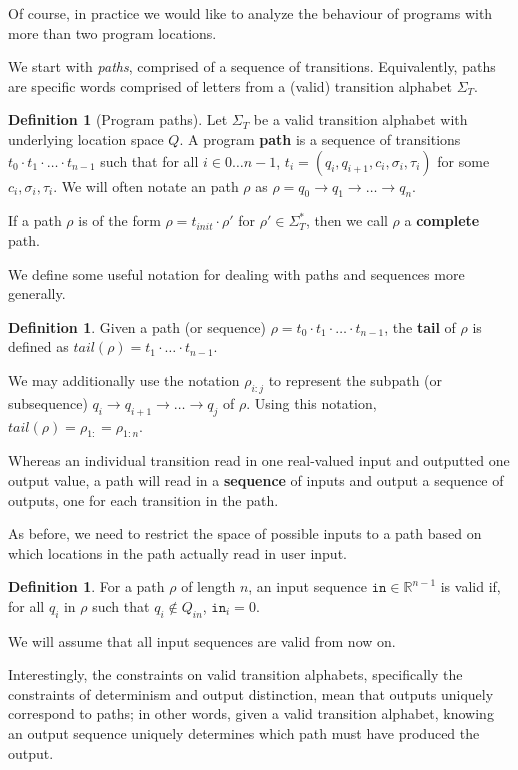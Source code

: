 \documentclass[12pt]{article}
\newcommand{\RR}{\mathbb{R}}
\theoremstyle{definition}
\newtheorem{defn}[thm]{Definition}
\begin{document}
Of course, in practice we would like to analyze the behaviour of programs with more than two program locations.

We start with \textit{paths}, comprised of a sequence of transitions. Equivalently, paths are specific words comprised of letters from a (valid) transition alphabet $\Sigma_T$. 

\begin{defn}[Program paths]
    Let $\Sigma_T$ be a valid transition alphabet with underlying location space $Q$. A program \textbf{path} is a sequence of transitions $t_0\cdot t_1\cdot \ldots\cdot t_{n-1}$ such that for all $i\in 0\ldots n-1$, $t_i = (q_i, q_{i+1}, c_i, \sigma_i, \tau_i)$ for some $c_i, \sigma_i, \tau_i$. We will often notate an path $\rho$ as $\rho = q_0\to q_1\to \ldots \to q_n$. 

    If a path $\rho$ is of the form $\rho = t_{init}\cdot \rho'$ for $\rho'\in \Sigma_T^*$, then we call $\rho$ a \textbf{complete} path. 
\end{defn}

We define some useful notation for dealing with paths and sequences more generally. 

\begin{defn}
    Given a path (or sequence) $\rho = t_0\cdot t_1\cdot \ldots\cdot t_{n-1}$, the \textbf{tail} of $\rho$ is defined as $tail(\rho) = t_1\cdot \ldots\cdot t_{n-1}$. 

    We may additionally use the notation $\rho_{i:j}$ to represent the subpath (or subsequence) $q_i\to q_{i+1}\to \ldots \to q_j$ of $\rho$. Using this notation, $tail(\rho) = \rho_{1:} = \rho_{1:n}$.
\end{defn}

Whereas an individual transition read in one real-valued input and outputted one output value, a path will read in a \textbf{sequence} of inputs and output a sequence of outputs, one for each transition in the path.

As before, we need to restrict the space of possible inputs to a path based on which locations in the path actually read in user input.
\begin{defn}
    For a path $\rho$ of length $n$, an input sequence $\texttt{in}\in \RR^{n-1}$ is valid if, for all $q_i$ in $\rho$ such that $q_i \notin Q_{in}$, $\texttt{in}_i = 0$.  
\end{defn} 

We will assume that all input sequences are valid from now on. 

Interestingly, the constraints on valid transition alphabets, specifically the constraints of determinism and output distinction, mean that outputs uniquely correspond to paths; in other words, given a valid transition alphabet, knowing an output sequence uniquely determines which path must have produced the output. 
\end{document}

